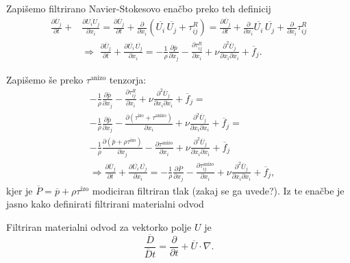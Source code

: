 \documentclass[mat2, tisk]{fmfdelo}
\begin{document}
Zapišemo filtrirano Navier-Stokesovo enačbo preko teh definicij
\begin{align*}
\frac{\partial \overline{U}_j}{\partial t} + &\frac{\partial \overline{U_i U_j}}{\partial x_i} = 
\frac{\partial \overline{U}_j}{\partial t} + \frac{\partial}{\partial x_i} (\overline{U_i}\, \overline{U_j} + \tau_{ij}^R) = 
\frac{\partial \overline{U}_j}{\partial t} + \frac{\partial}{\partial x_i} \overline{U_i}\, \overline{U_j} + \frac{\partial}{\partial x_i} \tau_{ij}^R\\[2mm]
&\Longrightarrow \,\,
\frac{\partial \overline{U}_j}{\partial t} + \frac{\partial \overline{U_i}\, \overline{U_j}}{\partial x_i} = -\frac{1}{\rho} \frac{\partial \overline{p}}{\partial x_j} 
- \frac{\partial \tau_{ij}^R}{\partial x_i}+ \nu \frac{\partial^2 \overline{U}_j}{\partial x_i \partial x_i} + \overline{f}_j.
\end{align*}

Zapišemo še preko $\tau^\text{anizo}$ tenzorja:
\begin{align*}
&-\frac{1}{\rho} \frac{\partial \overline{p}}{\partial x_j} - \frac{\partial \tau_{ij}^R}{\partial x_i}+ \nu \frac{\partial^2 \overline{U}_j}{\partial x_i \partial x_i} + \overline{f}_j = \\[1mm]
&-\frac{1}{\rho} \frac{\partial \overline{p}}{\partial x_j} - \frac{\partial (\tau^\text{izo} + \tau^\text{anizo}) }{\partial x_i}+ \nu \frac{\partial^2 \overline{U}_j}{\partial x_i \partial x_i} + \overline{f}_j = \\[1mm]
&-\frac{1}{\rho} \frac{\partial (\overline{p} + \rho\tau^\text{izo})}{\partial x_j} - \frac{\partial \tau^\text{anizo} }{\partial x_i}+ \nu \frac{\partial^2 \overline{U}_j}{\partial x_i \partial x_i} + \overline{f}_j \\[2mm]
&\Longrightarrow 
\frac{\partial \overline{U}_j}{\partial t} + \frac{\partial \overline{U_i}\, \overline{U_j}}{\partial x_i} = -\frac{1}{\rho} \frac{\partial \overline{P}}{\partial x_j} 
- \frac{\partial \tau_{ij}^\text{anizo}}{\partial x_i}+ \nu \frac{\partial^2 \overline{U}_j}{\partial x_i \partial x_i} + \overline{f}_j,
\end{align*}
kjer je $\overline{P} = \overline{p} + \rho\tau^\text{izo}$ modiciran filtriran tlak 
(zakaj se ga uvede?). Iz te enačbe je jasno kako definirati filtrirani materialni odvod 
\begin{definicija}
Filtriran materialni odvod za vektorko polje $U$ je 
\begin{equation}
\frac{\overline{D}}{\overline{D}t} = \frac{\partial}{\partial t} + \overline{U}\cdot \nabla.
\end{equation}
\end{definicija}
\end{document}
